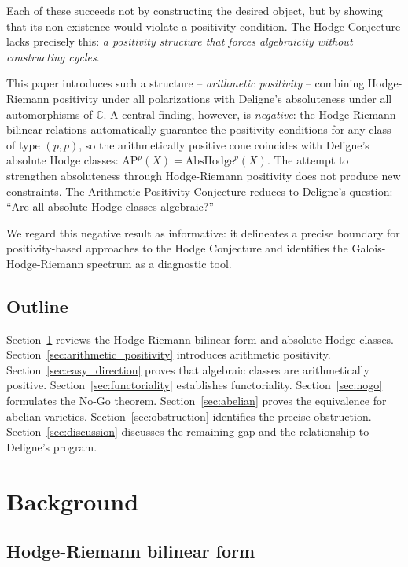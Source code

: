 \documentclass[aps,prd,twocolumn,superscriptaddress,nofootinbib]{revtex4-2}
\theoremstyle{definition}
\theoremstyle{remark}
\begin{document}
Each of these succeeds not by constructing the desired object, but by showing that its non-existence would violate a positivity condition. The Hodge Conjecture lacks precisely this: \textit{a positivity structure that forces algebraicity without constructing cycles}.

This paper introduces such a structure -- \textit{arithmetic positivity} -- combining Hodge-Riemann positivity under all polarizations with Deligne's absoluteness under all automorphisms of $\mathbb{C}$. A central finding, however, is \textit{negative}: the Hodge-Riemann bilinear relations automatically guarantee the positivity conditions for any class of type $(p,p)$, so the arithmetically positive cone coincides with Deligne's absolute Hodge classes: $\mathrm{AP}^p(X) = \mathrm{AbsHodge}^p(X)$. The attempt to strengthen absoluteness through Hodge-Riemann positivity does not produce new constraints. The Arithmetic Positivity Conjecture reduces to Deligne's question: ``Are all absolute Hodge classes algebraic?''

We regard this negative result as informative: it delineates a precise boundary for positivity-based approaches to the Hodge Conjecture and identifies the Galois-Hodge-Riemann spectrum as a diagnostic tool.

\subsection{Outline}

Section~\ref{sec:background} reviews the Hodge-Riemann bilinear form and absolute Hodge classes. Section~\ref{sec:arithmetic_positivity} introduces arithmetic positivity. Section~\ref{sec:easy_direction} proves that algebraic classes are arithmetically positive. Section~\ref{sec:functoriality} establishes functoriality. Section~\ref{sec:nogo} formulates the No-Go theorem. Section~\ref{sec:abelian} proves the equivalence for abelian varieties. Section~\ref{sec:obstruction} identifies the precise obstruction. Section~\ref{sec:discussion} discusses the remaining gap and the relationship to Deligne's program.


\section{Background}
\label{sec:background}

\subsection{Hodge-Riemann bilinear form}
\end{document}

